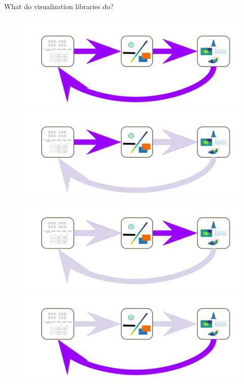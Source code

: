 \documentclass[xcolor={dvipsnames}]{beamer}
\begin{document}
\begin{frame}{What do visualization libraries do?}
    \begin{figure}
        \begin{overprint}
            \includegraphics[width=\linewidth]{figures/flow/s2.png}
            \includegraphics[width=\linewidth]{figures/flow/s_vc.png}
            \includegraphics[width=\linewidth]{figures/flow/s_mark.png}
            \includegraphics[width=\linewidth]{figures/flow/s3.png}
        \end{overprint}
    \end{figure}
\end{frame}
\end{document}
